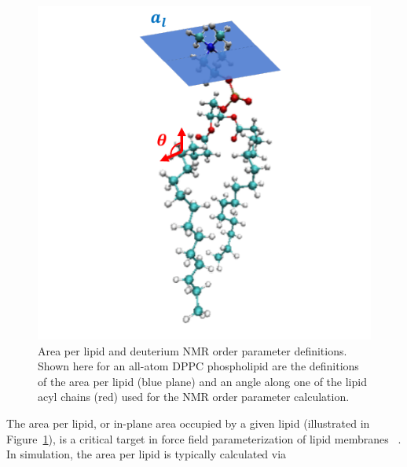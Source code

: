 \documentclass[9pt,bestpractices,pubversion]{livecoms}
\begin{document}
\begin{figure}[h]
\centering
\begin{minipage}[c]{\columnwidth}
\centering
	\includegraphics[width=\columnwidth]{figures/apl_nmr.pdf}
	\caption{Area per lipid and deuterium NMR order parameter definitions. Shown here for an all-atom DPPC phospholipid are the definitions of the area per lipid (blue plane) and an angle along one of the lipid acyl chains (red) used for the NMR order parameter calculation.}
	\label{fig:aplnmr}
\end{minipage}
\end{figure}

The area per lipid, or in-plane area occupied by a given lipid (illustrated in Figure~\ref{fig:aplnmr}), is a critical target in force field parameterization of lipid membranes ~\cite{Venable2015,Klauda2010d}.
In simulation, the area per lipid is typically calculated via
\end{document}
